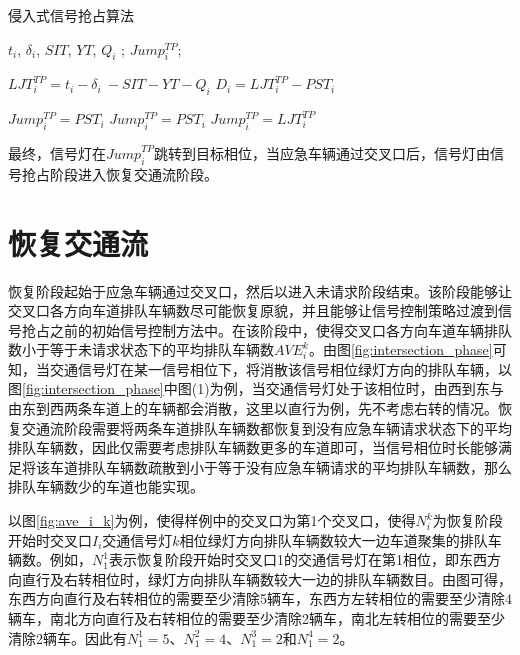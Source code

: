 \begin{algorithm}[!ht]
	\renewcommand{\algorithmicrequire}{\textbf{Input:}}
	\renewcommand{\algorithmicensure}{\textbf{Output:}}
	\caption{侵入式信号抢占算法}
	\label{alg:qinrushi}
	\begin{algorithmic}[1]
		\REQUIRE ${t_i}$, ${\delta_i}$, ${SIT}$, ${YT}$, ${Q_i}$ ; %
		\ENSURE ${Jump_i^{TP}}$; %
		
		\STATE ${{LJT}_i^{TP}=t_i-\delta_i\ -SIT-YT-Q_i}$
		\STATE ${D_i={LJT}_i^{TP}-PST_i}$
		
		\STATE ${Jump_i^{TP} = PST_i}$
		\ELSE
		\STATE ${Jump_i^{TP} = PST_i}$
		\ELSE
		\STATE  ${Jump_i^{TP} = LJT_i^{TP}}$
		\ENDIF
		\ENDIF
		
	\end{algorithmic}
\end{algorithm}


最终，信号灯在${{Jump}_i^{TP}}$跳转到目标相位，当应急车辆通过交叉口后，信号灯由信号抢占阶段进入恢复交通流阶段。



\section{恢复交通流}
恢复阶段起始于应急车辆通过交叉口，然后以进入未请求阶段结束。该阶段能够让交叉口各方向车道排队车辆数尽可能恢复原貌，并且能够让信号控制策略过渡到信号抢占之前的初始信号控制方法中。在该阶段中，使得交叉口各方向车道车辆排队数小于等于未请求状态下的平均排队车辆数${AVE_i^k}$。由图\ref{fig:intersection_phase}可知，当交通信号灯在某一信号相位下，将消散该信号相位绿灯方向的排队车辆，以图\ref{fig:intersection_phase}中图(1)为例，当交通信号灯处于该相位时，由西到东与由东到西两条车道上的车辆都会消散，这里以直行为例，先不考虑右转的情况。恢复交通流阶段需要将两条车道排队车辆数都恢复到没有应急车辆请求状态下的平均排队车辆数，因此仅需要考虑排队车辆数更多的车道即可，当信号相位时长能够满足将该车道排队车辆数疏散到小于等于没有应急车辆请求的平均排队车辆数，那么排队车辆数少的车道也能实现。



以图\ref{fig:ave_i_k}为例，使得样例中的交叉口为第1个交叉口，使得${N_i^k}$为恢复阶段开始时交叉口${I_i}$交通信号灯${k}$相位绿灯方向排队车辆数较大一边车道聚集的排队车辆数。例如，${N_1^1}$表示恢复阶段开始时交叉口1的交通信号灯在第1相位，即东西方向直行及右转相位时，绿灯方向排队车辆数较大一边的排队车辆数目。由图可得，东西方向直行及右转相位的需要至少清除5辆车，东西方左转相位的需要至少清除4辆车，南北方向直行及右转相位的需要至少清除2辆车，南北左转相位的需要至少清除2辆车。因此有${N_1^1}=5$、${N_1^2}=4$、${N_1^3}=2$和${N_1^4}=2$。

